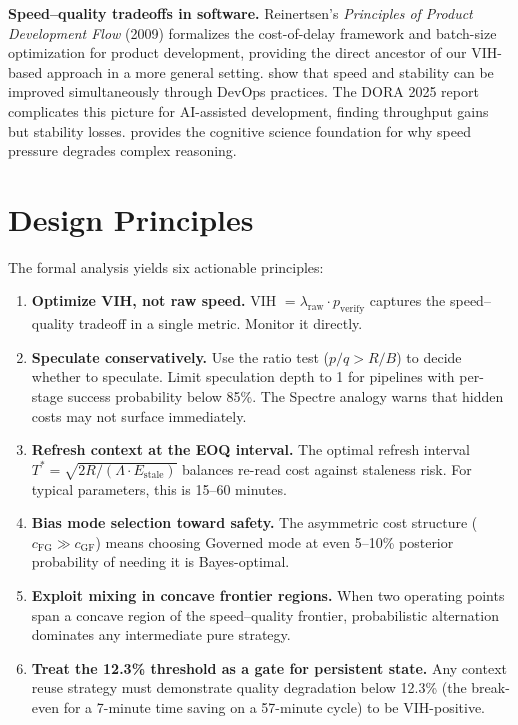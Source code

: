\documentclass[11pt, a4paper, logo, copyright]{googledeepmind}
\begin{document}
\textbf{Speed--quality tradeoffs in software.} Reinertsen's \emph{Principles of Product Development Flow} (2009) formalizes the cost-of-delay framework and batch-size optimization for product development, providing the direct ancestor of our VIH-based approach in a more general setting. \citet{forsgren2018accelerate} show that speed and stability can be improved simultaneously through DevOps practices. The DORA 2025 report \citep{dora2025} complicates this picture for AI-assisted development, finding throughput gains but stability losses. \citet{kahneman2011thinking} provides the cognitive science foundation for why speed pressure degrades complex reasoning.


\section{Design Principles}\label{sec:principles}

The formal analysis yields six actionable principles:

\begin{enumerate}
    \item \textbf{Optimize VIH, not raw speed.} VIH $= \lambda_{\mathrm{raw}} \cdot p_{\mathrm{verify}}$ captures the speed--quality tradeoff in a single metric. Monitor it directly.

    \item \textbf{Speculate conservatively.} Use the ratio test ($p/q > R/B$) to decide whether to speculate. Limit speculation depth to 1 for pipelines with per-stage success probability below 85\%. The Spectre analogy warns that hidden costs may not surface immediately.

    \item \textbf{Refresh context at the EOQ interval.} The optimal refresh interval $T^* = \sqrt{2R/(\Lambda \cdot E_{\mathrm{stale}})}$ balances re-read cost against staleness risk. For typical parameters, this is 15--60 minutes.

    \item \textbf{Bias mode selection toward safety.} The asymmetric cost structure ($c_{\mathrm{FG}} \gg c_{\mathrm{GF}}$) means choosing Governed mode at even 5--10\% posterior probability of needing it is Bayes-optimal.

    \item \textbf{Exploit mixing in concave frontier regions.} When two operating points span a concave region of the speed--quality frontier, probabilistic alternation dominates any intermediate pure strategy.

    \item \textbf{Treat the 12.3\% threshold as a gate for persistent state.} Any context reuse strategy must demonstrate quality degradation below 12.3\% (the break-even for a 7-minute time saving on a 57-minute cycle) to be VIH-positive.
\end{enumerate}
\end{document}
